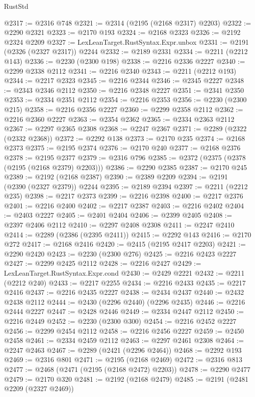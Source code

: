 \begin{lexlean}{RustStd}
\begin{coremodule}
@2317 := @2316 @748
@2321 := @2314 (@2195 (@2168 @2317) @2203)
@2322 := @2290 @2321
@2323 := @2170 @193
@2324 := @2168 @2323
@2326 := @2192 @2324 @2209
@2327 := LexLeanTarget.RustSyntax.Expr.unbox
@2331 := @2191 (@2326 (@2327 @2317)) @2244
@2332 := @2189 @2331
@2334 := @2211 (@2212 @143)
@2336 := @2230 (@2300 @198)
@2338 := @2216 @2336 @2227
@2340 := @2299 @2338 @2112
@2341 := @2216 @2340
@2343 := @2211 (@2212 @193)
@2344 := @2217 @2323
@2345 := @2216 @2344
@2346 := @2345 @2227
@2348 := @2343 @2346 @2112
@2350 := @2216 @2348 @2227
@2351 := @2341 @2350
@2353 := @2334 @2351 @2112
@2354 := @2216 @2353
@2356 := @2230 (@2300 @215)
@2358 := @2216 @2356 @2227
@2360 := @2299 @2358 @2112
@2362 := @2216 @2360 @2227
@2363 := @2354 @2362
@2365 := @2334 @2363 @2112
@2367 := @2297 @2365 @2308
@2368 := @2247 @2367
@2371 := @2289 (@2322 (@2332 @2368))
@2372 := @2292 @138
@2373 := @2170 @235
@2374 := @2168 @2373
@2375 := @2195 @2374
@2376 := @2170 @240
@2377 := @2168 @2376
@2378 := @2195 @2377
@2379 := @2316 @796
@2385 := @2372 (@2375 (@2378 (@2195 (@2168 @2379) @2203)))
@2386 := @2290 @2385
@2387 := @2170 @245
@2389 := @2192 (@2168 @2387)
@2390 := @2389 @2209
@2394 := @2191 (@2390 (@2327 @2379)) @2244
@2395 := @2189 @2394
@2397 := @2211 (@2212 @235)
@2398 := @2217 @2373
@2399 := @2216 @2398
@2400 := @2217 @2376
@2401 := @2216 @2400
@2402 := @2217 @2387
@2403 := @2216 @2402
@2404 := @2403 @2227
@2405 := @2401 @2404
@2406 := @2399 @2405
@2408 := @2397 @2406 @2112
@2410 := @2297 @2408 @2308
@2411 := @2247 @2410
@2414 := @2289 (@2386 (@2395 @2411))
@2415 := @2292 @143
@2416 := @2170 @272
@2417 := @2168 @2416
@2420 := @2415 (@2195 @2417 @2203)
@2421 := @2290 @2420
@2423 := @2230 (@2300 @276)
@2425 := @2216 @2423 @2227
@2427 := @2299 @2425 @2112
@2428 := @2216 @2427
@2429 := LexLeanTarget.RustSyntax.Expr.cond
@2430 := @2429 @2221
@2432 := @2211 (@2212 @240)
@2433 := @2217 @2255
@2434 := @2216 @2433
@2435 := @2217 @2416
@2437 := @2216 @2435 @2227
@2438 := @2434 @2437
@2440 := @2432 @2438 @2112
@2444 := @2430 (@2296 @2440) (@2296 @2435)
@2446 := @2216 @2444 @2227
@2447 := @2428 @2446
@2449 := @2334 @2447 @2112
@2450 := @2216 @2449
@2452 := @2230 (@2300 @300)
@2454 := @2216 @2452 @2227
@2456 := @2299 @2454 @2112
@2458 := @2216 @2456 @2227
@2459 := @2450 @2458
@2461 := @2334 @2459 @2112
@2463 := @2297 @2461 @2308
@2464 := @2247 @2463
@2467 := @2289 (@2421 (@2296 @2464))
@2468 := @2292 @193
@2469 := @2316 @801
@2471 := @2195 (@2168 @2469)
@2472 := @2316 @813
@2477 := @2468 (@2471 (@2195 (@2168 @2472) @2203))
@2478 := @2290 @2477
@2479 := @2170 @320
@2481 := @2192 (@2168 @2479)
@2485 := @2191 (@2481 @2209 (@2327 @2469))

\end{coremodule}
\end{lexlean}
